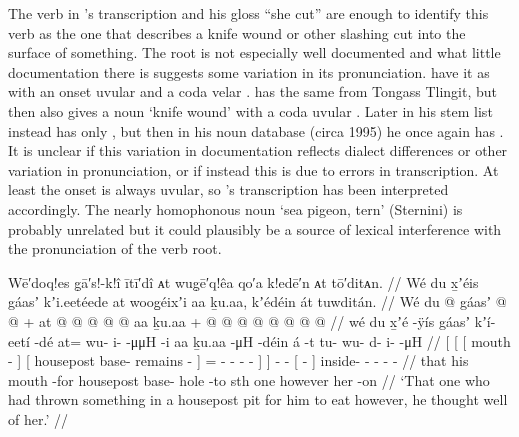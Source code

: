 The verb  in \citeauthor{swanton:1909}’s transcription and his gloss “she cut” are enough to identify this verb as the one that describes a knife wound or other slashing cut into the surface of something.
The root is not especially well documented and what little documentation there is suggests some variation in its pronunciation.
\citeauthor{story-naish:1973} have it as  with an onset uvular and a coda velar \parencite[61.711]{story-naish:1973}.
\citeauthor{leer:1973} has the same from Tongass Tlingit, but then also gives a noun  ‘knife wound’ with a coda uvular \parencite[f01/230]{leer:1973}.
Later in his stem list \citeauthor{leer:1978b} instead has only  \parencite[79]{leer:1978b}, but then in his noun database (circa 1995) he once again has .
It is unclear if this variation in documentation reflects dialect differences or other variation in pronunciation, or if instead this is due to errors in transcription.
At least the onset is always uvular, so \citeauthor{swanton:1909}’s transcription has been interpreted accordingly.
The nearly homophonous noun  ‘sea pigeon, tern’ (Sternini) is probably unrelated but it could plausibly be a source of lexical interference with the pronunciation of the verb root.

\ex\label{ex:90-87-thought-well-of}%
%
\begingl
	\glpreamble	Wē′doq!es g̣ā′s!-k!î ītī′dî ᴀt wug̣ē′q!êa qo′a k!edē′n ᴀt tō′ditᴀn. //
	\glpreamble	Wé du x̱ʼéis gáasʼ kʼi.eetéede at woog̱éixʼi aa ḵu.aa, kʼédéin át tuwditán. //
	\gla	{} Wé {} {} du  @ {} {}
				{} gáasʼ  @ {} @ {} {} +
				at @  @ {} @ {} @ {} @ {} {} aa {}
		ḵu.aa +
		 @ {} @ {}
		{}  @ {} {}
		 @ {} @ {} @ {} @ {} @ {} //
	\glb	{} wé {} {} du x̱ʼé -ÿís {}
				{} gáasʼ kʼí- eetí -dé {}
				at= wu- i-  -μμH -i {} aa {}
		ḵu.aa
		 -μH -déin
		{} á -t {}
		tu- wu- d- i-  -μH //
	\glc	{}[  {}[ {}[  mouth - {}]
				{}[ housepost base- remains - {}]
				= - -  - - {}]  {}]
		 - -
		{}[  - {}]
		inside- - - -  - //
	\gld	{} that {} {} his mouth -for {}
				{} housepost base- hole -to {}
				sth  {} {} {} {} {} one {}
		however
		 {} {}
		{} her -on {}
		 {} {} {} {} {} //
	\glft	‘That one who had thrown something in a housepost pit for him to eat however,
		he thought well of her.’
		//
\endgl
\xe

